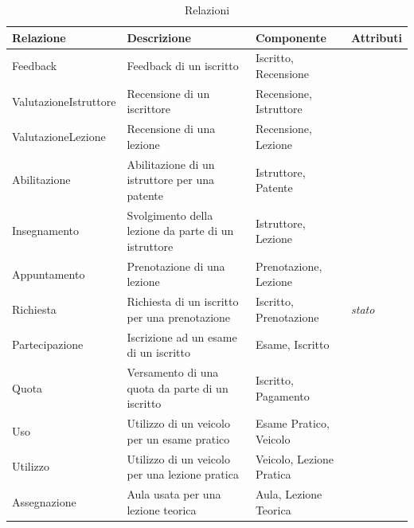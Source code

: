 \documentclass[10pt,twoside]{article}
\begin{document}
{    \begin{table}[H]
        \centering
        \begin{tabularx}{\textwidth}{|>{\centering\arraybackslash}p{3cm}|>{\centering\arraybackslash}X|>{\centering\arraybackslash}p{4.85cm}|>{\centering\arraybackslash}X|}
            \hline
            \rowcolor{lightgray!40}
            \textbf{Relazione} & \textbf{Descrizione} & \textbf{Componente} & \textbf{Attributi} \\
            \hline
            \rowcolor{white!40}
            Feedback & Feedback di un iscritto & Iscritto, Recensione & \\
            \hline
            \rowcolor{white!40}
            ValutazioneIstruttore & Recensione di un iscrittore & Recensione, Istruttore & \\
            \hline
            \rowcolor{white!40}
            ValutazioneLezione & Recensione di una lezione & Recensione, Lezione & \\
            \hline
            \rowcolor{white!40}
            Abilitazione & Abilitazione di un istruttore per una patente & Istruttore, Patente & \\
            \hline
            \rowcolor{white!40}
            Insegnamento & Svolgimento della lezione da parte di un istruttore & Istruttore, Lezione & \\
            \hline
            \rowcolor{white!40}
            Appuntamento & Prenotazione di una lezione & Prenotazione, Lezione & \\
            \hline
            \rowcolor{white!40}
            Richiesta & Richiesta di un iscritto per una prenotazione & Iscritto, Prenotazione & \textit{stato}\\
            \hline
            \rowcolor{white!40}
            Partecipazione & Iscrizione ad un esame di un iscritto & Esame, Iscritto & \\
            \hline
            \rowcolor{white!40}
            Quota & Versamento di una quota da parte di un iscritto & Iscritto, Pagamento & \\
            \hline
            \rowcolor{white!40}
            Uso & Utilizzo di un veicolo per un esame pratico & Esame Pratico, Veicolo& \\
            \hline
            \rowcolor{white!40}
            Utilizzo & Utilizzo di un veicolo per una lezione pratica & Veicolo, Lezione Pratica & \\
            \hline
            \rowcolor{white!40}
            Assegnazione & Aula usata per una lezione teorica & Aula, Lezione Teorica & \\
            \hline
        \end{tabularx}
        \caption{Relazioni}
        \label{fig:tabellaRelazioni}
    \end{table}

}
\end{document}
